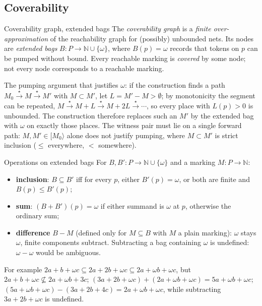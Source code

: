 \subsection{Coverability}

\begin{definitionbox}{Coverability graph, extended bags}
The \emph{coverability graph} is a \emph{finite over-approximation} of the reachability graph for (possibly) unbounded nets. Its nodes are \emph{extended bags} $B : P \to \mathbb{N} \cup \{\omega\}$, where $B(p) = \omega$ records that tokens on $p$ can be pumped without bound. Every reachable marking is \emph{covered} by some node; not every node corresponds to a reachable marking.
\end{definitionbox}

The pumping argument that justifies $\omega$: if the construction finds a path $M_0 \xrightarrow{\star} M \xrightarrow{\star} M'$ with $M \subset M'$, let $L = M' - M > \emptyset$; by monotonicity the segment can be repeated, $M \xrightarrow{\star} M + L \xrightarrow{\star} M + 2L \xrightarrow{\star} \cdots$, so every place with $L(p) > 0$ is unbounded. The construction therefore replaces such an $M'$ by the extended bag with $\omega$ on exactly those places. The witness pair must lie on a single forward path: $M, M' \in [M_0\rangle$ alone does not justify pumping, where $M \subset M'$ is strict inclusion ($\leq$ everywhere, $<$ somewhere).

\begin{definitionbox}{Operations on extended bags}
For $B, B' : P \to \mathbb{N} \cup \{\omega\}$ and a marking $M : P \to \mathbb{N}$:
\begin{itemize}
  \item \textbf{inclusion}: $B \subseteq B'$ iff for every $p$, either $B'(p) = \omega$, or both are finite and $B(p) \leq B'(p)$;
  \item \textbf{sum}: $(B + B')(p) = \omega$ if either summand is $\omega$ at $p$, otherwise the ordinary sum;
  \item \textbf{difference} $B - M$ (defined only for $M \subseteq B$ with $M$ a plain marking): $\omega$ stays $\omega$, finite components subtract. Subtracting a bag containing $\omega$ is undefined: $\omega - \omega$ would be ambiguous.
\end{itemize}
For example $2a + b + \omega c \subseteq 2a + 2b + \omega c \subseteq 2a + \omega b + \omega c$, but $2a + b + \omega c \not\subseteq 2a + \omega b + 3c$; $(3a + 2b + \omega c) + (2a + \omega b + \omega c) = 5a + \omega b + \omega c$; $(5a + \omega b + \omega c) - (3a + 2b + 4c) = 2a + \omega b + \omega c$, while subtracting $3a + 2b + \omega c$ is undefined.
\end{definitionbox}

